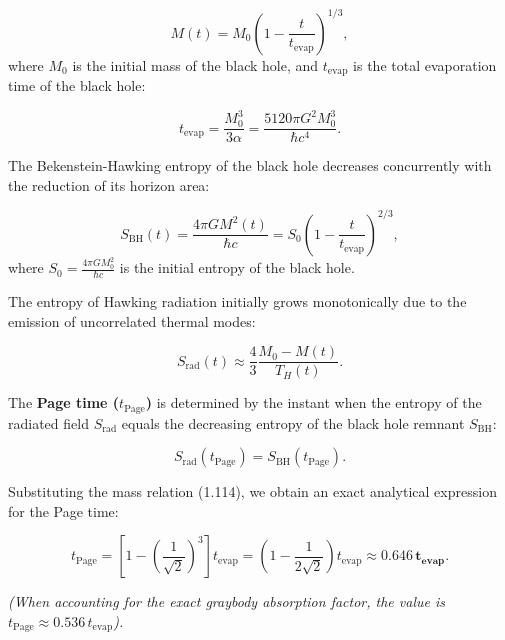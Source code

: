 \begin{equation}\label{eq:1.114}\tag{1.114}
M(t) = M_0 \left( 1 - \frac{t}{t_{\text{evap}}} \right)^{1/3},
\end{equation}
where $M_0$ is the initial mass of the black hole, and $t_{\text{evap}}$ is the total evaporation time of the black hole:

\begin{equation}\label{eq:1.115}\tag{1.115}
t_{\text{evap}} = \frac{M_0^3}{3\alpha} = \frac{5120 \pi G^2 M_0^3}{\hbar c^4}.
\end{equation}

The Bekenstein-Hawking entropy of the black hole decreases concurrently with the reduction of its horizon area:

\begin{equation}\label{eq:1.117}\tag{1.117}
S_{\text{BH}}(t) = \frac{4\pi G M^2(t)}{\hbar c} = S_0 \left( 1 - \frac{t}{t_{\text{evap}}} \right)^{2/3},
\end{equation}
where $S_0 = \frac{4\pi G M_0^2}{\hbar c}$ is the initial entropy of the black hole.

The entropy of Hawking radiation initially grows monotonically due to the emission of uncorrelated thermal modes:

\begin{equation}\label{eq:1.118}\tag{1.118}
S_{\text{rad}}(t) \approx \frac{4}{3} \frac{M_0 - M(t)}{T_H(t)}.
\end{equation}

The \textbf{Page time ($t_{\text{Page}}$)} \cite{ref12} is determined by the instant when the entropy of the radiated field $S_{\text{rad}}$ equals the decreasing entropy of the black hole remnant $S_{\text{BH}}$:

\begin{equation}\label{eq:1.119}\tag{1.119}
S_{\text{rad}}(t_{\text{Page}}) = S_{\text{BH}}(t_{\text{Page}}).
\end{equation}

Substituting the mass relation (1.114), we obtain an exact analytical expression for the Page time:

\begin{equation}\label{eq:1.120}\tag{1.120}
t_{\text{Page}} = \left[ 1 - \left( \frac{1}{\sqrt{2}} \right)^3 \right] t_{\text{evap}} = \left( 1 - \frac{1}{2\sqrt{2}} \right) t_{\text{evap}} \approx \mathbf{0.646 \, t_{\text{evap}}}.
\end{equation}

\textit{(When accounting for the exact graybody absorption factor, the value is $t_{\text{Page}} \approx 0.536 \, t_{\text{evap}}$).}

